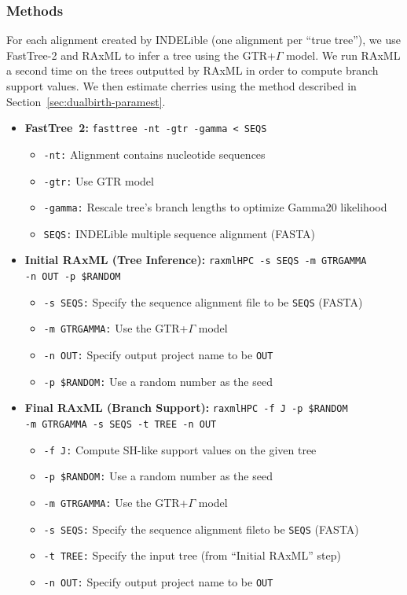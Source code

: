 \subsubsection{Methods}
For each alignment created by INDELible (one alignment per ``true tree''), we use FastTree-2 and RAxML to infer a tree using the \gls{GTR}+$\Gamma$ model. We run RAxML a second time on the trees outputted by RAxML in order to compute branch support values. We then estimate cherries using the method described in Section~\ref{sec:dualbirth-paramest}.
\begin{itemize}
\item \textbf{FastTree~2:} \texttt{fasttree -nt -gtr -gamma < SEQS}
\begin{itemize}
\item \texttt{-nt:} Alignment contains nucleotide sequences
\item \texttt{-gtr:} Use \gls{GTR} model
\item \texttt{-gamma:} Rescale tree's branch lengths to optimize Gamma20 likelihood
\item \texttt{SEQS:} INDELible multiple sequence alignment (FASTA)
\end{itemize}

\item \textbf{Initial RAxML (Tree Inference):} \texttt{raxmlHPC -s SEQS -m GTRGAMMA\\-n OUT -p \$RANDOM}
\begin{itemize}
\item \texttt{-s SEQS:} Specify the sequence alignment file to be \texttt{SEQS} (FASTA)
\item \texttt{-m GTRGAMMA:} Use the \gls{GTR}+$\Gamma$ model
\item \texttt{-n OUT:} Specify output project name to be \texttt{OUT}
\item \texttt{-p \$RANDOM:} Use a random number as the seed
\end{itemize}

\item \textbf{Final RAxML (Branch Support):} \texttt{raxmlHPC -f J -p \$RANDOM\\-m GTRGAMMA -s SEQS -t TREE -n OUT}
\begin{itemize}
\item \texttt{-f J:} Compute SH-like support values on the given tree
\item \texttt{-p \$RANDOM:} Use a random number as the seed
\item \texttt{-m GTRGAMMA:} Use the \gls{GTR}+$\Gamma$ model
\item \texttt{-s SEQS:} Specify the sequence alignment fileto be \texttt{SEQS} (FASTA)
\item \texttt{-t TREE:} Specify the input tree (from ``Initial RAxML'' step)
\item \texttt{-n OUT:} Specify output project name to be \texttt{OUT}
\end{itemize}


\end{itemize}
